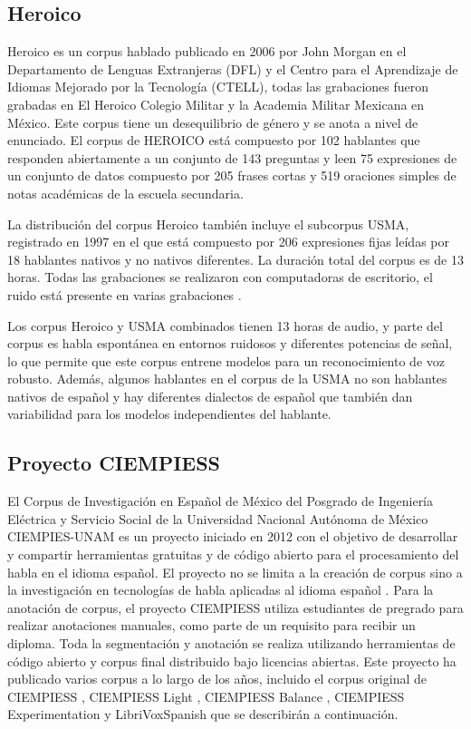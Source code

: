 \documentclass[a4paper,12pt,twoside]{report}
\begin{document}
\subsection{Heroico}

Heroico es un corpus hablado publicado en 2006 por John Morgan en el Departamento de Lenguas Extranjeras (DFL) y el Centro para el Aprendizaje de Idiomas Mejorado por la Tecnología (CTELL), todas las grabaciones fueron grabadas en El Heroico Colegio Militar y la Academia Militar Mexicana en México. Este corpus tiene un desequilibrio de género y se anota a nivel de enunciado. El corpus de HEROICO está compuesto por 102 hablantes que responden abiertamente a un conjunto de 143 preguntas y leen 75 expresiones de un conjunto de datos compuesto por 205 frases cortas y 519 oraciones simples de notas académicas de la escuela secundaria.

La distribución del corpus Heroico también incluye el subcorpus USMA, registrado en 1997 en el que está compuesto por 206 expresiones fijas leídas por 18 hablantes nativos y no nativos diferentes. La duración total del corpus es de 13 horas. Todas las grabaciones se realizaron con computadoras de escritorio, el ruido está presente en varias grabaciones \cite{heroico}.

Los corpus Heroico y USMA combinados tienen 13 horas de audio, y parte del corpus es habla espontánea en entornos ruidosos y diferentes potencias de señal, lo que permite que este corpus entrene modelos para un reconocimiento de voz robusto. Además, algunos hablantes en el corpus de la USMA no son hablantes nativos de español y hay diferentes dialectos de español que también dan variabilidad para los modelos independientes del hablante.

\subsection{Proyecto CIEMPIESS}

El Corpus de Investigación en Español de México del Posgrado de Ingeniería Eléctrica y Servicio Social de la Universidad Nacional Autónoma de México CIEMPIES-UNAM es un proyecto iniciado en 2012 con el objetivo de desarrollar y compartir herramientas gratuitas y de código abierto para el procesamiento del habla en el idioma español. El proyecto no se limita a la creación de corpus sino a la investigación en tecnologías de habla aplicadas al idioma español \cite{CIEMPIESS-Webpage}. Para la anotación de corpus, el proyecto CIEMPIESS utiliza estudiantes de pregrado para realizar anotaciones manuales, como parte de un requisito para recibir un diploma. Toda la segmentación y anotación se realiza utilizando herramientas de código abierto y corpus final distribuido bajo licencias abiertas. Este proyecto ha publicado varios corpus a lo largo de los años, incluido el corpus original de CIEMPIESS \cite {CIEMPIESS}, CIEMPIESS Light \cite {CIEMPIESS-LIGHT}, CIEMPIESS Balance \cite {CIEMPIESS-BALANCE}, CIEMPIESS Experimentation \cite {CIEMPIESS-Experimentation} y LibriVoxSpanish \cite {LibriVox-Spanish} que se describirán a continuación.
\end{document}
